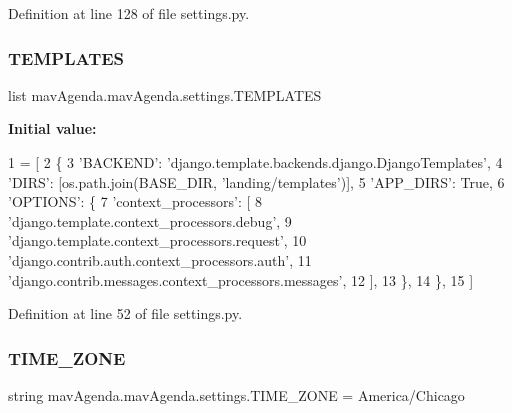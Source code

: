 Definition at line 128 of file settings.\+py.

\mbox{\label{namespacemavAgenda_1_1mavAgenda_1_1settings_a4c3ff903ca3c3d39a0f2721eaf4a9638}} 
\subsubsection{\texorpdfstring{T\+E\+M\+P\+L\+A\+T\+ES}{TEMPLATES}}
{\footnotesize\ttfamily list mav\+Agenda.\+mav\+Agenda.\+settings.\+T\+E\+M\+P\+L\+A\+T\+ES}

{\bfseries Initial value\+:}
\begin{DoxyCode}
1 =  [
2     \{
3         \textcolor{stringliteral}{'BACKEND'}: \textcolor{stringliteral}{'django.template.backends.django.DjangoTemplates'},
4         \textcolor{stringliteral}{'DIRS'}: [os.path.join(BASE\_DIR, \textcolor{stringliteral}{'landing/templates'})],
5         \textcolor{stringliteral}{'APP\_DIRS'}: \textcolor{keyword}{True},
6         \textcolor{stringliteral}{'OPTIONS'}: \{
7             \textcolor{stringliteral}{'context\_processors'}: [
8                 \textcolor{stringliteral}{'django.template.context\_processors.debug'},
9                 \textcolor{stringliteral}{'django.template.context\_processors.request'},
10                 \textcolor{stringliteral}{'django.contrib.auth.context\_processors.auth'},
11                 \textcolor{stringliteral}{'django.contrib.messages.context\_processors.messages'},
12             ],
13         \},
14     \},
15 ]
\end{DoxyCode}


Definition at line 52 of file settings.\+py.

\mbox{\label{namespacemavAgenda_1_1mavAgenda_1_1settings_a2f9c69f77469f2e2cc5a6a4cb89efa55}} 
\subsubsection{\texorpdfstring{T\+I\+M\+E\+\_\+\+Z\+O\+NE}{TIME\_ZONE}}
{\footnotesize\ttfamily string mav\+Agenda.\+mav\+Agenda.\+settings.\+T\+I\+M\+E\+\_\+\+Z\+O\+NE = \textquotesingle{}America/Chicago\textquotesingle{}}



